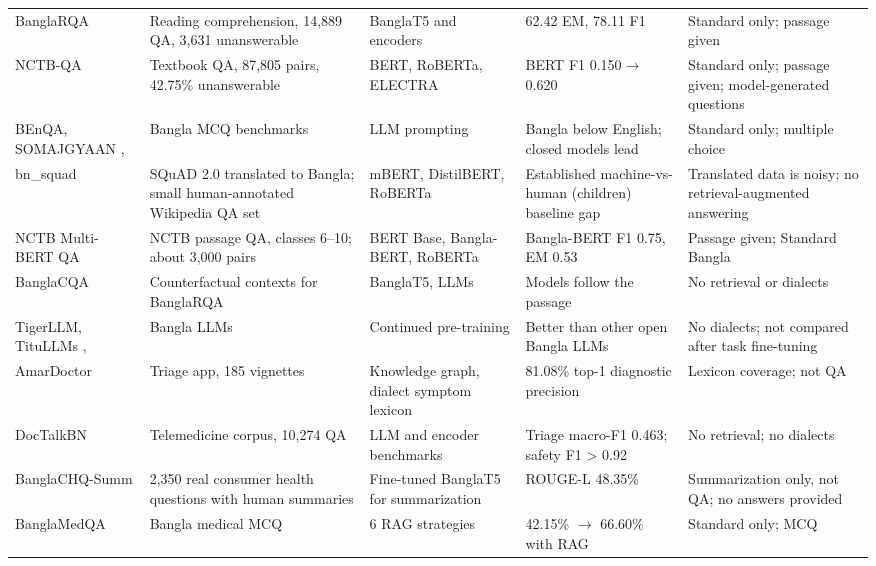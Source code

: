 {\begin{longtable}{@{}H{0.135\textwidth}H{0.195\textwidth}H{0.165\textwidth}H{0.195\textwidth}H{0.170\textwidth}@{}}
BanglaRQA \cite{ekram2022banglarqa} & Reading comprehension, 14,889 QA, 3,631 unanswerable & BanglaT5 and encoders & 62.42 EM, 78.11 F1 & Standard only; passage given \\
NCTB-QA \cite{nctbqa} & Textbook QA, 87,805 pairs, 42.75\% unanswerable & BERT, RoBERTa, ELECTRA & BERT F1 0.150\ensuremath{\rightarrow}\allowbreak{}0.620 & Standard only; passage given; model-generated questions \\
BEnQA, SOMAJGYAAN \cite{shafayat2024benqa}, \cite{shifa2025somajgyaan} & Bangla MCQ benchmarks & LLM prompting & Bangla below English; closed models lead & Standard only; multiple choice \\
bn\_squad \cite{mayeesha2021bengaliqa} & SQuAD 2.0 translated to Bangla; small human-annotated Wikipedia QA set & mBERT, DistilBERT, RoBERTa & Established machine-vs-human (children) baseline gap & Translated data is noisy; no retrieval-augmented answering \\
NCTB Multi-BERT QA \cite{khondoker2024unlocking} & NCTB passage QA, classes 6--10; about 3,000 pairs & BERT Base, Bangla-BERT, RoBERTa & Bangla-BERT F1 0.75, EM 0.53 & Passage given; Standard Bangla \\
BanglaCQA \cite{azmary2026banglacqa} & Counterfactual contexts for BanglaRQA & BanglaT5, LLMs & Models follow the passage & No retrieval or dialects \\
TigerLLM, TituLLMs \cite{raihan2025tigerllm}, \cite{titulm2025} & Bangla LLMs & Continued pre-training & Better than other open Bangla LLMs & No dialects; not compared after task fine-tuning \\
AmarDoctor \cite{nahar2025amardoctor} & Triage app, 185 vignettes & Knowledge graph, dialect symptom lexicon & 81.08\% top-1 diagnostic precision & Lexicon coverage; not QA \\
DocTalkBN \cite{saha2026doctalkbn} & Telemedicine corpus, 10,274 QA & LLM and encoder benchmarks & Triage macro-F1 0.463; safety F1 > 0.92 & No retrieval; no dialects \\
Bangla\allowbreak{}CHQ-Summ \cite{khan2023banglachqsumm} & 2,350 real consumer health questions with human summaries & Fine-tuned BanglaT5 for summarization & ROUGE-L 48.35\% & Summarization only, not QA; no answers provided \\
Bangla\-MedQA \cite{banglamedqa} & Bangla medical MCQ & 6 RAG strategies & 42.15\% \ensuremath{\rightarrow}\allowbreak{} 66.60\% with RAG & Standard only; MCQ \\
\bottomrule
\end{longtable}
}

